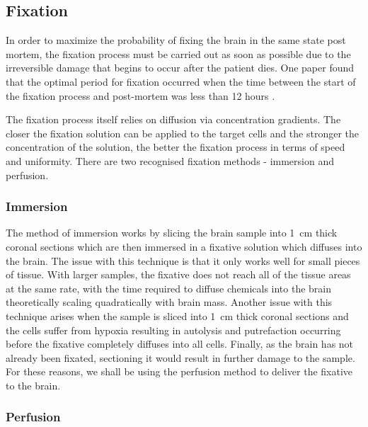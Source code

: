 \documentclass[a4paper, 11pt]{article}
\numberwithin{equation}{section}
\begin{document}
\subsection{Fixation}

In order to maximize the probability of fixing the brain in the same state post mortem, the fixation process must be carried out as soon as possible due to the irreversible damage that begins to occur after the patient dies. One paper found that the optimal period for fixation occurred when the time between the start of the fixation process and post-mortem was less than 12 hours \cite{Beach1987183}. 

The fixation process itself relies on diffusion via concentration gradients. The closer the fixation solution can be applied to the target cells and the stronger the concentration of the solution, the better the fixation process in terms of speed and uniformity. There are two recognised fixation methods - immersion and perfusion.

\subsubsection{Immersion}

The method of immersion works by slicing the brain sample into \SI{1}{\centi\metre} thick coronal sections \cite{Beach1987183} which are then immersed in a fixative solution which diffuses into the brain. The issue with this technique is that it only works well for small pieces of tissue. With larger samples, the fixative does not reach all of the tissue areas at the same rate, with the time required to diffuse chemicals into the brain theoretically scaling quadratically with brain mass. Another issue with this technique arises when the sample is sliced into \SI{1}{\centi\metre} thick coronal sections \cite{Beach1987183} and the cells suffer from hypoxia resulting in autolysis and putrefaction occurring before the fixative completely diffuses into all cells. Finally, as the brain has not already been fixated, sectioning it would result in further damage to the sample. For these reasons, we shall be using the perfusion method to deliver the fixative to the brain. 

\subsubsection{Perfusion}
\end{document}
